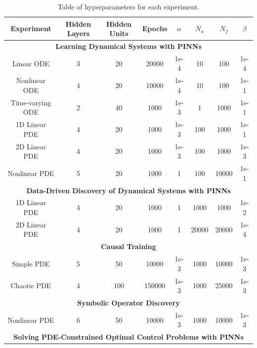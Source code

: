 \begin{table}[H]
    \begin{adjustwidth}{-1cm}{-1cm}
    \caption{Table of hyperparameters for each experiment.}
    \begin{tabular}{ |c|c|c|c|c|c|c|c| }
        \hline
        Experiment & Hidden Layers & Hidden Units & Epochs & $\alpha$ & $N_u$ & $N_f$ & $\beta$ \\
        \hline
        \hline
        \multicolumn{8}{|c|}{\textbf{Learning Dynamical Systems with PINNs}} \\
        \hline
        \hline
        Linear ODE & 3 & 20 & 20000 & 1e-4 & 10 & 100 & 1e-4 \\
        \hline
        Nonlinear ODE & 4 & 20 & 10000 & 1e-4 & 10 & 100 & 1e-1 \\
        \hline
        Time-varying ODE & 2 & 40 & 1000 & 1e-3 & 1 & 1000 & 1e-1 \\
        \hline
        1D Linear PDE & 4 & 20 & 1000 & 1e-3 & 100 & 1000 & 1e-1 \\
        \hline
        2D Linear PDE & 4 & 20 & 1000 & 1e-3 & 100 & 1000 & 1e-3 \\
        \hline
        Nonlinear PDE & 5 & 20 & 1000 & 1 & 100 & 10000 & 1e-1 \\
        \hline
        \hline
        \multicolumn{8}{|c|}{\textbf{Data-Driven Discovery of Dynamical Systems with PINNs}} \\
        \hline
        \hline
        1D Linear PDE & 4 & 20 & 1000 & 1 & 1000 & 1000 & 1e-2 \\
        \hline
        2D Linear PDE & 4 & 20 & 1000 & 1 & 20000 & 20000 & 1e-4 \\
        \hline
        \hline
        \multicolumn{8}{|c|}{\textbf{Causal Training}} \\
        \hline
        \hline
        Simple PDE & 5 & 50 & 10000 & 1e-3 & 1000 & 10000 & 1e-3 \\
        \hline
        Chaotic PDE & 4 & 100 & 150000 & 1e-3 & 1000 & 25000 & 1e-3 \\
        \hline
        \hline
        \multicolumn{8}{|c|}{\textbf{Symbolic Operator Discovery}} \\
        \hline
        \hline
        Nonlinear PDE & 6 & 50 & 10000 & 1e-3 & 1000 & 10000 & 1e-3 \\
        \hline
        \hline
        \multicolumn{8}{|c|}{\textbf{Solving PDE-Constrained Optimal Control Problems with PINNs}} \\
        \hline

\end{tabular}
\end{adjustwidth}
\end{table}
